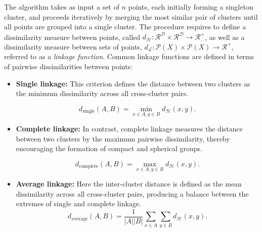         The algorithm takes as input a set of $n$ points, each initially forming a singleton cluster, and proceeds iteratively by merging the most similar pair of clusters until all points are grouped into a single cluster. The procedure requires to define a dissimilarity measure between points, called $d_\mathcal{H}: \mathcal{R^D} \times \mathcal{R^D} \to \mathcal{R}^+$, as well as a dissimilarity measure between sets of points, $d_{\mathcal{L}}: \mathcal{P}(X) \times \mathcal{P}(X) \to \mathcal{R}^+$, referred to as a \emph{linkage function}. Common linkage functions are defined in terms of pairwise dissimilarities between points:  
                
        \begin{itemize}
            \item \textbf{Single linkage:} This criterion defines the distance between two clusters as the minimum dissimilarity across all cross-cluster pairs.  

            \[
                d_{\text{single}}(A,B) = \min_{x \in A, y \in B} d_\mathcal{H}(x,y).
            \]

            \item \textbf{Complete linkage:} In contrast, complete linkage measures the distance between two clusters by the maximum pairwise dissimilarity, thereby encouraging the formation of compact and spherical groups.  

            \[
                d_{\text{complete}}(A,B) = \max_{x \in A, y \in B} d_\mathcal{H}(x,y).
            \]

            \item \textbf{Average linkage:} Here the inter-cluster distance is defined as the mean dissimilarity across all cross-cluster pairs, producing a balance between the extremes of single and complete linkage.  
            \[
                d_{\text{average}}(A,B) = \frac{1}{|A||B|} \sum_{x \in A} \sum_{y \in B} d_\mathcal{H}(x,y).
            \]


        \end{itemize}

